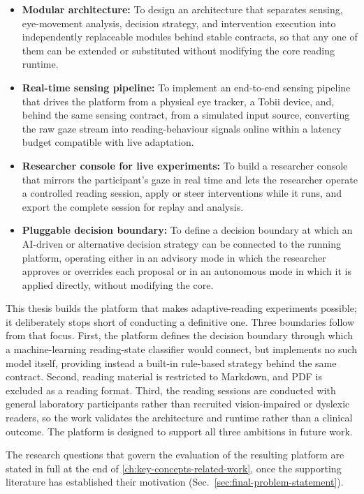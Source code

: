 \begin{itemize}

  \item \textbf{Modular architecture:}
    To design an architecture that separates sensing, eye-movement analysis, decision strategy, and intervention execution into independently replaceable modules behind stable contracts, so that any one of them can be extended or substituted without modifying the core reading runtime.

  \item \textbf{Real-time sensing pipeline:}
    To implement an end-to-end sensing pipeline that drives the platform from a physical eye tracker, a Tobii device, and, behind the same sensing contract, from a simulated input source, converting the raw gaze stream into reading-behaviour signals online within a latency budget compatible with live adaptation.

  \item \textbf{Researcher console for live experiments:}
    To build a researcher console that mirrors the participant's gaze in real time and lets the researcher operate a controlled reading session, apply or steer interventions while it runs, and export the complete session for replay and analysis.

  \item \textbf{Pluggable decision boundary:}
    To define a decision boundary at which an AI-driven or alternative decision strategy can be connected to the running platform, operating either in an advisory mode in which the researcher approves or overrides each proposal or in an autonomous mode in which it is applied directly, without modifying the core.

\end{itemize}

This thesis builds the platform that makes adaptive-reading experiments possible; it deliberately stops short of conducting a definitive one.
Three boundaries follow from that focus.
First, the platform defines the decision boundary through which a machine-learning reading-state classifier would connect, but implements no such model itself, providing instead a built-in rule-based strategy behind the same contract.
Second, reading material is restricted to Markdown, and PDF is excluded as a reading format.
Third, the reading sessions are conducted with general laboratory participants rather than recruited vision-impaired or dyslexic readers, so the work validates the architecture and runtime rather than a clinical outcome.
The platform is designed to support all three ambitions in future work.

The research questions that govern the evaluation of the resulting platform are stated in full at the end of \cref{ch:key-concepts-related-work}, once the supporting literature has established their motivation (Sec.~\ref{sec:final-problem-statement}).
